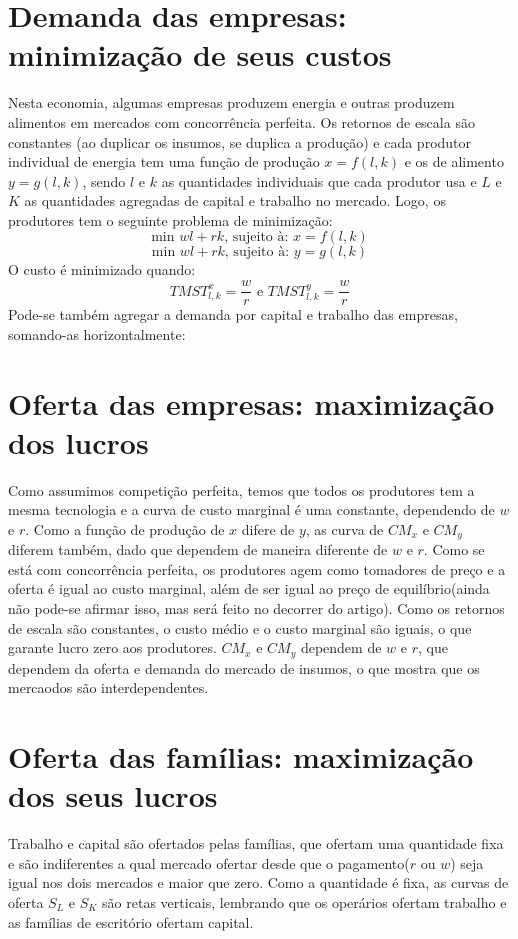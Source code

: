 \documentclass[oneside,12pt, letterpaper]{book}
\begin{document}
{{{\section{Demanda das empresas: minimiza{\c c}{\~a}o de seus custos}
Nesta economia, algumas empresas produzem energia e outras produzem alimentos em mercados com concorr{\^e}ncia perfeita. Os retornos de escala s{\~a}o constantes (ao
duplicar os insumos, se duplica a produ{\c c}{\~a}o) e cada produtor individual de energia tem uma fun{\c c}{\~a}o  de produ{\c c}{\~a}o $x = f(l, k)$ e os de alimento $y = g(l, k)$, sendo $l$ e $k$ as quantidades individuais	
que cada produtor usa e $L$ e $K$ as quantidades agregadas de capital e trabalho no mercado. Logo, os produtores tem o seguinte problema de minimiza{\c c}{\~a}o:
\[ \text{min }wl+rk  \text{, sujeito {\`a}: }x=f(l,k)  \]
\[ \text{min }wl+rk  \text{, sujeito {\`a}: }y=g(l,k)  \]
O custo {\'e} minimizado quando: \[ TMST^x_{l,k} = \frac{w}{r} \text{   e   } TMST^y_{l,k} = \frac{w}{r} \]
Pode-se tamb{\'e}m agregar a demanda por capital e trabalho das empresas, somando-as horizontalmente: 
\section{Oferta das empresas: maximiza{\c c}{\~a}o dos lucros} 
Como assumimos competi{\c c}{\~a}o perfeita, temos que todos os produtores tem a mesma tecnologia e a curva de custo marginal {\'e} uma constante, dependendo de $w$ e $r$. 
Como a fun{\c c}{\~a}o de produ{\c c}{\~a}o de $x$ difere de $y$, as curva de $CM_x$ e $CM_y$ diferem tamb{\'e}m, dado que dependem de maneira diferente de $w$ e $r$. Como se
est{\'a} com concorr{\^e}ncia perfeita, os produtores agem como tomadores de pre{\c c}o e a oferta {\'e} igual ao custo marginal, al{\'e}m de ser igual ao pre{\c c}o de equil{\'i}brio(ainda n{\~a}o 
pode-se afirmar isso, mas ser{\'a} feito no decorrer do artigo). 
Como os retornos de escala s{\~a}o constantes, o custo m{\'e}dio e o custo marginal s{\~a}o iguais, o que garante lucro zero aos produtores. $CM_x$ e $CM_y$ dependem de
$w$ e $r$, que dependem da oferta e demanda do mercado de insumos, o que mostra que os mercaodos s{\~a}o interdependentes.
\section{Oferta das fam{\'i}lias: maximiza{\c c}{\~a}o dos seus lucros}
Trabalho e capital s{\~a}o ofertados pelas fam{\'i}lias, que ofertam uma quantidade fixa e s{\~a}o indiferentes a qual mercado ofertar desde que o pagamento($r$ ou $w$) seja 
igual nos dois mercados e maior que zero. Como a quantidade {\'e} fixa, as curvas de oferta $S_L$ e $S_K$ s{\~a}o retas verticais, lembrando que os oper{\'a}rios ofertam trabalho
e as fam{\'i}lias de escrit{\'o}rio ofertam capital. 
}}}
\end{document}
